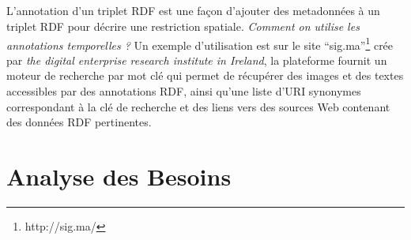 \subparagraph{}
L'annotation d'un triplet RDF est une façon d'ajouter des metadonnées à un triplet RDF pour décrire une restriction spatiale.
\newline
\textit{Comment on utilise les annotations temporelles ?} Un exemple d'utilisation est sur le site ``sig.ma''\footnote{http://sig.ma/} crée par \textit{the digital enterprise research institute in Ireland}, la plateforme fournit un moteur de recherche par mot clé qui permet de récupérer des images et des textes accessibles par des annotations RDF, ainsi qu'une liste d'URI synonymes correspondant à la clé de recherche et des liens vers des sources Web contenant des données RDF pertinentes.
\section{Analyse des Besoins}
